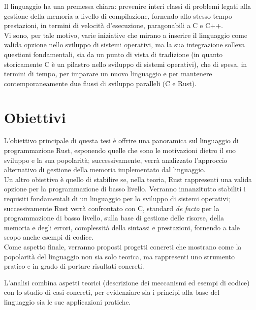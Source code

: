  Il linguaggio ha una premessa chiara: prevenire interi classi di problemi legati
 alla gestione della memoria a livello di compilazione, 
fornendo allo stesso tempo prestazioni, in termini di velocità d'esecuzione, 
paragonabili a C e C++. \hfill
\vspace{8pt}\\
\noindent Vi sono, per tale motivo, varie iniziative che mirano a inserire il linguaggio
 come valida opzione nello sviluppo di sistemi operativi,
ma la sua integrazione solleva questioni fondamentali, sia da un punto di vista
 di tradizione (in quanto storicamente C è un pilastro nello sviluppo di sistemi
  operativi), che di spesa, in termini di tempo, 
 per imparare un nuovo linguaggio e per mantenere
  contemporaneamente due flussi di sviluppo paralleli (C e Rust).

\section{Obiettivi} 
L'obiettivo principale di questa tesi è offrire una panoramica sul linguaggio 
di programmazione Rust, esponendo quelle che sono le motivazioni 
dietro il suo sviluppo e la sua popolarità; successivamente, verrà analizzato 
l'approccio alternativo di gestione della memoria implementato dal linguaggio. \hfill
\vspace{7pt}\\
\noindent Un altro obiettivo è quello di stabilire se, nella teoria, Rust rappresenti una valida 
opzione per la programmazione di basso livello. Verranno innanzitutto stabiliti i requisiti 
fondamentali di un linguaggio per lo sviluppo di sistemi operativi; successivamente Rust verrà 
confrontato con C, standard \textit{de facto} per la programmazione di basso 
livello, sulla base di gestione delle risorse, della memoria e degli errori, complessità della sintassi e 
prestazioni, fornendo a tale scopo anche esempi di codice. \hfill
\vspace{7pt}\\
\noindent Come aspetto finale, verranno proposti progetti 
concreti che mostrano come la popolarità del linguaggio non sia solo 
teorica, ma rappresenti uno strumento pratico e in grado di portare risultati concreti.

L'analisi combina aspetti teorici (descrizione dei meccanismi ed esempi di codice)
 con lo studio di casi concreti, per evidenziare sia i principi 
alla base del linguaggio sia le sue applicazioni pratiche. 

